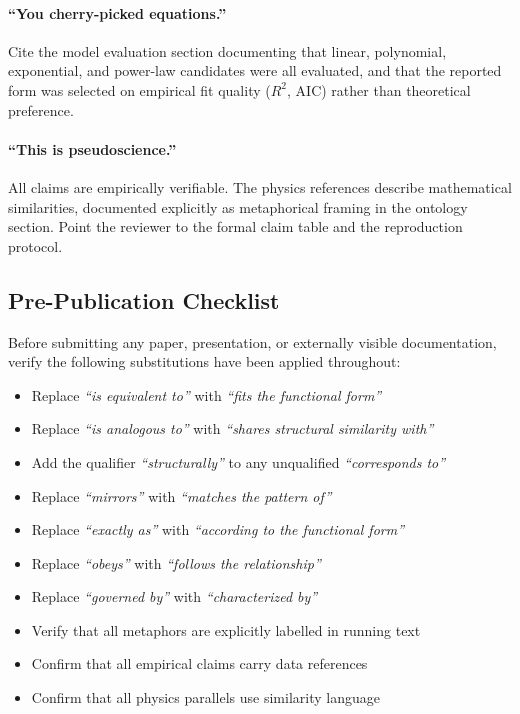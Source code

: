 \paragraph{``You cherry-picked equations.''}
Cite the model evaluation section documenting that linear, polynomial,
exponential, and power-law candidates were all evaluated, and that the
reported form was selected on empirical fit quality ($R^2$, AIC) rather than
theoretical preference.

\paragraph{``This is pseudoscience.''}
All claims are empirically verifiable. The physics references describe
mathematical similarities, documented explicitly as metaphorical framing
in the ontology section. Point the reviewer to the formal claim table
and the reproduction protocol.

\subsection{Pre-Publication Checklist}

Before submitting any paper, presentation, or externally visible documentation,
verify the following substitutions have been applied throughout:

\begin{itemize}
  \item Replace \emph{``is equivalent to''} with \emph{``fits the functional form''}
  \item Replace \emph{``is analogous to''} with \emph{``shares structural similarity with''}
  \item Add the qualifier \emph{``structurally''} to any unqualified \emph{``corresponds to''}
  \item Replace \emph{``mirrors''} with \emph{``matches the pattern of''}
  \item Replace \emph{``exactly as''} with \emph{``according to the functional form''}
  \item Replace \emph{``obeys''} with \emph{``follows the relationship''}
  \item Replace \emph{``governed by''} with \emph{``characterized by''}
  \item Verify that all metaphors are explicitly labelled in running text
  \item Confirm that all empirical claims carry data references
  \item Confirm that all physics parallels use similarity language
\end{itemize}

